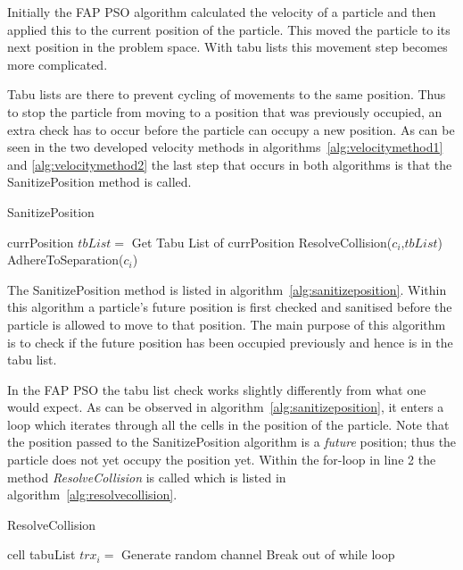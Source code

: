 Initially the FAP PSO algorithm calculated the velocity of a particle and then applied this to the current position of the particle. This moved the particle to its next position in the problem space. With tabu lists this movement step becomes more complicated.

Tabu lists are there to prevent cycling of movements to the same position. Thus to stop the particle from moving to a position that was previously occupied, an extra check has to occur before the particle can occupy a new position. As can be seen in the two developed velocity methods in algorithms~\ref{alg:velocitymethod1} and \ref{alg:velocitymethod2} the last step that occurs in both algorithms is that the SanitizePosition method is called.

\begin{algorithm}
\caption{SanitizePosition}
\label{alg:sanitizeposition}
\begin{algorithmic}[1]
	\Require currPosition
		\State $tbList = $ Get Tabu List of currPosition
		\State ResolveCollision($c_i$,$tbList$)
		\State AdhereToSeparation($c_i$)
	\EndFor
\end{algorithmic}
\end{algorithm}

The SanitizePosition method is listed in algorithm~\ref{alg:sanitizeposition}. Within this algorithm a particle's future position is first checked and sanitised before the particle is allowed to move to that position. The main purpose of this algorithm is to check if the future position has been occupied previously and hence is in the tabu list.

In the FAP PSO the tabu list check works slightly differently from what one would expect. As can be observed in algorithm~\ref{alg:sanitizeposition}, it enters a loop which iterates through all the cells in the position of the particle. Note that the position passed to the SanitizePosition algorithm is a \emph{future} position; thus the particle does not yet occupy the position yet. Within the for-loop in line 2 the method \emph{ResolveCollision} is called which is listed in algorithm~\ref{alg:resolvecollision}.

\begin{algorithm}
\caption{ResolveCollision}
\label{alg:resolvecollision}
\begin{algorithmic}[1]
	\Require cell
	\Require tabuList
				\State $trx_i = $ Generate random channel
					\State Break out of while loop
				\EndIf
			\EndWhile
	\EndFor
\end{algorithmic}
\end{algorithm}

